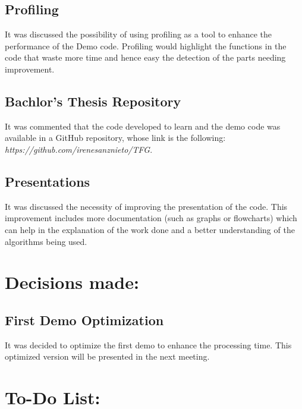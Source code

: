 \documentclass{article}
\newenvironment{myindentpar}[1]%
 {\begin{list}{}%
         {\setlength{\leftmargin}{#1}}%
         \item[]%
 }
 {\end{list}}
\begin{document}
	\subsection{Profiling}
		\begin{myindentpar}{1cm}
			It was discussed the possibility of using profiling as a tool to enhance the performance of the Demo code. Profiling would highlight the functions in the code that waste more time and hence easy the detection of the parts needing improvement. 
		\end{myindentpar}
		
	\subsection{Bachlor's Thesis Repository}
		\begin{myindentpar}{1cm}
			It was commented that the code developed to learn and the demo code was available in a GitHub repository, whose link is the following: \emph{
			https://github.com/irenesanznieto/TFG}.
		\end{myindentpar}
		
	\subsection{Presentations}
		\begin{myindentpar}{1cm} 
			It was discussed the necessity of improving the presentation of the code. This improvement includes more documentation (such as graphs or flowcharts) which can help in the explanation of the work done and a better understanding of the algorithms being used. 
		\end{myindentpar}
		




\section{\LARGE Decisions made:}
	\subsection{First Demo Optimization}
		\begin{myindentpar}{1cm} 
			It was decided to optimize the first demo to enhance the processing time. This optimized version will be presented in the next meeting. 
		\end{myindentpar}


\section{\LARGE To-Do List: }
\end{document}
